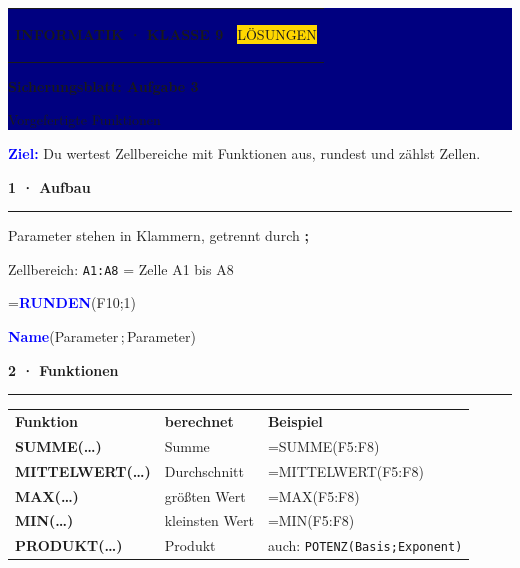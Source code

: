 \documentclass[10pt,a4paper]{article}
\newcommand{\sectiontitle}[1]{%
  \vspace{2.3mm}
  {\color{Blue}\bfseries\large #1}\par
  \vspace{0.8mm}
  {\color{Blue}\rule{\linewidth}{0.7pt}}\par
  \vspace{1.2mm}
}
\begin{document}
\colorbox{Navy}{%
  \parbox{\dimexpr\linewidth-2\fboxsep\relax}{%
    \vspace{3mm}\color{white}
    \begin{tabularx}{\linewidth}{@{}Xr@{}}
      {\small\bfseries INFORMATIK · KLASSE 9} &
      \colorbox{Gold}{\color{Navy}\small\bfseries\strut LÖSUNGEN}
    \end{tabularx}
    \vspace{2.5mm}

    {\fontsize{22}{25}\selectfont\bfseries Sicherungsblatt: Aufgabe 3}\par
    \vspace{1mm}
    {\large Vorgefertigte Funktionen}
    \vspace{3mm}
  }%
}

\vspace{3mm}
\colorbox{Sky}{%
  \parbox{\dimexpr\linewidth-2\fboxsep\relax}{%
    \vspace{1.8mm}
    \textcolor{Blue}{\bfseries Ziel:}
    Du wertest Zellbereiche mit Funktionen aus, rundest und zählst Zellen.
    \vspace{1.8mm}
  }%
}

\sectiontitle{1 · Aufbau}

\begin{minipage}[t]{\dimexpr\linewidth-70mm\relax}
  \vspace{1mm}
  Parameter stehen in Klammern, getrennt durch \textbf{;}\par
  \vspace{1.5mm}
  Zellbereich: \texttt{A1:A8} = Zelle A1 bis A8
\end{minipage}\hfill
\begin{minipage}[t]{64mm}
  \vspace{0pt}
  \colorbox{CodeBg}{\parbox{\dimexpr\linewidth-2\fboxsep\relax}{%
    \centering\vspace{1.5mm}
    {\large\ttfamily =\textcolor{Blue}{\bfseries RUNDEN}(F10;1)}\par
    \vspace{1mm}
    {\small\color{Muted}\textcolor{Blue}{\bfseries Name}(Parameter\,;\,Parameter)}\par
    \vspace{1.5mm}
  }}
\end{minipage}

\sectiontitle{2 · Funktionen}

\renewcommand{\arraystretch}{1.15}
\begin{tabularx}{\linewidth}{@{}>{\ttfamily\bfseries\small}p{32mm}X>{\ttfamily\small}p{52mm}@{}}
  \rowcolor{Sky}\normalfont\small\bfseries Funktion & \small\bfseries berechnet & \normalfont\small\bfseries Beispiel \\
  SUMME(…) & Summe & =SUMME(F5:F8) \\
  \rowcolor{CodeBg}MITTELWERT(…) & Durchschnitt & =MITTELWERT(F5:F8) \\
  MAX(…) & größten Wert & =MAX(F5:F8) \\
  \rowcolor{CodeBg}MIN(…) & kleinsten Wert & =MIN(F5:F8) \\
  PRODUKT(…) & Produkt & \normalfont\small auch: \texttt{POTENZ(Basis;Exponent)} \\
\end{tabularx}
\end{document}
